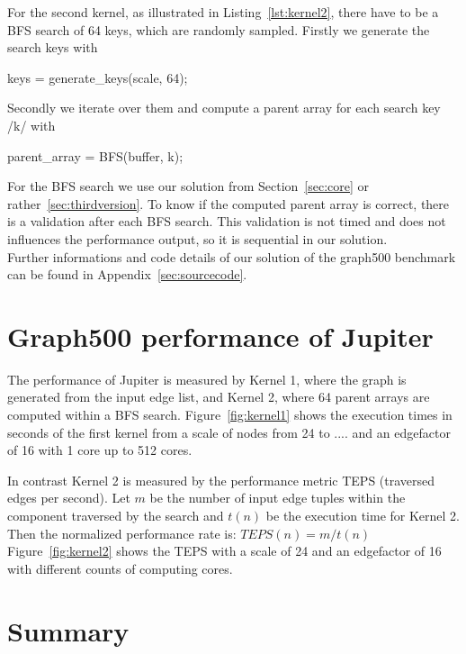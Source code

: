 \documentclass[12pt,a4paper]{article}
\begin{document}
For the second kernel, as illustrated in Listing~\ref{lst:kernel2}, there have to be a BFS search of 64 keys, which are randomly sampled. Firstly we generate the search keys with 
\begin{ccode}
keys = generate_keys(scale, 64);
\end{ccode}
Secondly we iterate over them and compute a parent array for each search key \cinline/k/ with
\begin{ccode}
parent_array = BFS(buffer, k);
\end{ccode}
For the BFS search we use our solution from Section~\ref{sec:core} or rather~\ref{sec:thirdversion}. To know if the computed parent array is correct, there is a validation after each BFS search. This validation is not timed and does not influences the performance output, so it is sequential in our solution.\\
Further informations and code details of our solution of the graph500 benchmark can be found in Appendix~\ref{sec:sourcecode}.

\section{Graph500 performance of Jupiter}
\label{sec:performance}

The performance of Jupiter is measured by Kernel 1, where the graph is generated from the input edge list, and Kernel 2, where 64 parent arrays are computed within a BFS search. Figure~\ref{fig:kernel1} shows the execution times in seconds of the first kernel from a scale of nodes from 24 to .... and an edgefactor of 16 with 1 core up to 512 cores.


In contrast Kernel 2 is measured by the performance metric TEPS (traversed edges per second).  Let \(m\) be the number of input edge tuples within the component traversed by the search and \(t(n)\) be the execution time for Kernel 2. Then the normalized performance rate is: \(TEPS(n) = m / t(n)\)\\
Figure~\ref{fig:kernel2} shows the TEPS with a scale of 24 and an edgefactor of 16 with different counts of computing cores.

\section{Summary}
\label{sec:summary}

\clearpage

\nocite{*}


\clearpage
\appendix
\end{document}
